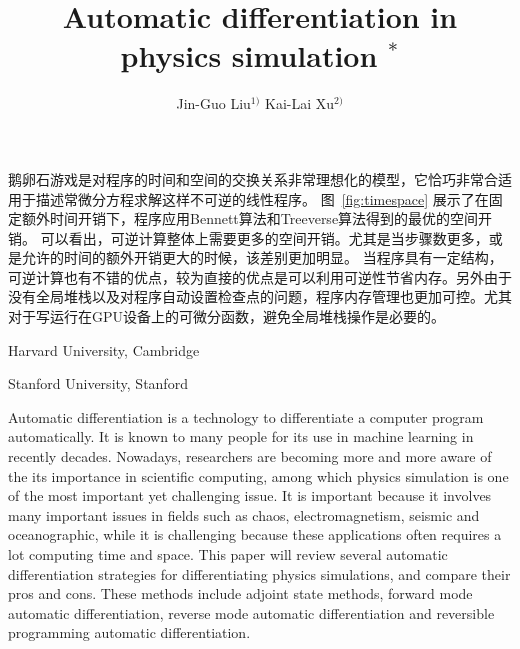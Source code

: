 \documentclass[A4,twoside,UTF8]{ctexart}
\begin{document}
鹅卵石游戏是对程序的时间和空间的交换关系非常理想化的模型，它恰巧非常合适用于描述常微分方程求解这样不可逆的线性程序。
图~\ref{fig:timespace} 展示了在固定额外时间开销下，程序应用Bennett算法和Treeverse算法得到的最优的空间开销。
可以看出，可逆计算整体上需要更多的空间开销。尤其是当步骤数更多，或是允许的时间的额外开销更大的时候，该差别更加明显。
当程序具有一定结构，可逆计算也有不错的优点，较为直接的优点是可以利用可逆性节省内存。另外由于没有全局堆栈以及对程序自动设置检查点的问题，程序内存管理也更加可控。尤其对于写运行在GPU设备上的可微分函数，避免全局堆栈操作是必要的。


%
%
%
%
%

\bigskip




\newpage

\title{Automatic differentiation in physics simulation $^{\ast}$}%




\author{Jin-Guo Liu$^{1)}$ \quad Kai-Lai Xu$^{2)}$}

\address{1)}{Harvard University, Cambridge }
\address{2)}{Stanford University, Stanford }




\eabstract{}

\small Automatic differentiation is a technology to differentiate a computer program automatically. It is known to many people for its use in machine learning in recently decades. Nowadays, researchers are becoming more and more aware of the its importance in scientific computing, among which physics simulation is one of the most important yet challenging issue. It is important because it involves many important issues in fields such as chaos, electromagnetism, seismic and oceanographic, while it is challenging because these applications often requires a lot computing time and space. This paper will review several automatic differentiation strategies for differentiating physics simulations, and compare their pros and cons. These methods include adjoint state methods, forward mode automatic differentiation, reverse mode automatic differentiation and reversible programming automatic differentiation.


\end{document}
